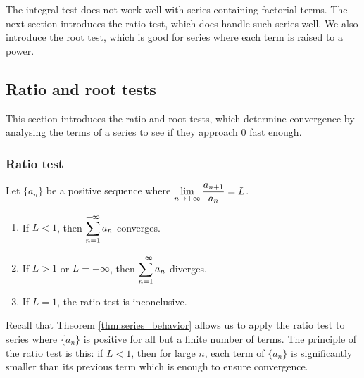 The integral test does not work well with series containing factorial terms. The next section introduces the ratio test, which does handle such series well. We also introduce the root test, which is good for series where each term is raised to a power.

\subsection{Ratio and root tests}\label{sec:ratio_root_tests}


 This section introduces the ratio and root tests, which determine convergence by analysing the terms of a series to see if they approach 0 fast enough.

\subsubsection{Ratio test}

\begin{theorem}\label{thm:ratio_test}
Let $\{a_n\}$ be a positive sequence where $\displaystyle \lim_{n\to+\infty}\frac{a_{n+1}}{a_n} = L$.
		\begin{enumerate}
			\item If $L<1$, then $\displaystyle\sum_{n=1}^{+\infty} a_n$ converges.
			\item	If $L>1$ or $L=+\infty$, then $\displaystyle\sum_{n=1}^{+\infty} a_n$ diverges.
			\item If $L=1$, the ratio test is inconclusive.
		\end{enumerate}
\end{theorem}

Recall that Theorem \ref{thm:series_behavior} allows us to apply the ratio test to series where $\{a_n\}$ is positive for all but a finite number of terms. The principle of the ratio test is this: if  $L<1$, then for large $n$, each term of $\{a_n\}$ is significantly smaller than its previous term which is enough to ensure convergence.

\ifanalysis

